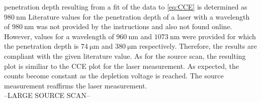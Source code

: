 penetration depth resulting from a fit of the data to \autoref{eq:CCE} is determined as $\qty{980}{\nano\metre}$
Literature values for the penetration depth of a laser with a wavelength of $\qty{980}{\nano\metre}$ was not provided
by the instructions and also not found online. However, values for a wavelength of $\qty{960}{\nano\metre}$ and $\qty{1073}{\nano\metre}$
were provided for which the penetration depth is $\qty{74}{\micro\metre}$ and $\qty{380}{\micro\metre}$ respectively\cite{SiliconStrip}. Therefore,
the results are compliant with the given literature value. As for the source scan, the resulting plot is similiar 
to the CCE plot for the laser measurement. As expected, the counts become constant as the depletion voltage is reached.
The source measurement reaffirms the laser measurement.\\
--LARGE SOURCE SCAN--